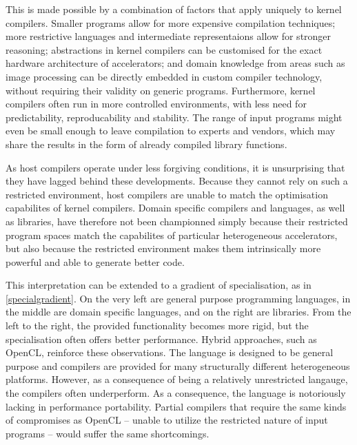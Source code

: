     This is made possible by a combination of factors that apply uniquely to
    kernel compilers.
    Smaller programs allow for more expensive compilation techniques;
    more restrictive languages and intermediate representaions allow for
    stronger reasoning;
    abstractions in kernel compilers can be customised for the exact hardware
    architecture of accelerators;
    and domain knowledge from areas such as image processing can be directly
    embedded in custom compiler technology, without requiring their validity
    on generic programs.
    Furthermore, kernel compilers often run in more controlled environments,
    with less need for predictability, reproducability and stability.
    The range of input programs might even be small enough to leave compilation
    to experts and vendors, which may share the results in the form of already
    compiled library functions.

    As host compilers operate under less forgiving conditions, it is
    unsurprising that they have lagged behind these developments.
    Because they cannot rely on such a restricted environment, host compilers
    are unable to match the optimisation capabilites of kernel compilers.
    Domain specific compilers and languages, as well as libraries, have
    therefore not been championned simply because their restricted program
    spaces match the capabilites of particular heterogeneous accelerators, but
    also because the restricted environment makes them intrinsically more
    powerful and able to generate better code.

    This interpretation can be extended to a gradient of specialisation, as in
    \autoref{specialgradient}.
    On the very left are general purpose programming languages, 
    in the middle are domain specific languages, and on the right are libraries.
    From the left to the right, the provided functionality becomes more rigid,
    but the specialisation often offers better performance.
    Hybrid approaches, such as OpenCL, reinforce these observations.
    The language is designed to be general purpose and compilers are provided
    for many structurally different heterogeneous platforms.
    However, as a consequence of being a relatively unrestricted langauge, the
    compilers often underperform.
    As a consequence, the language is notoriously lacking in performance
    portability.
    Partial compilers that require the same kinds of compromises as OpenCL --
    unable to utilize the restricted nature of input programs -- would suffer
    the same shortcomings.

